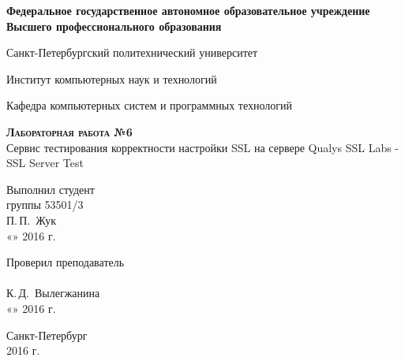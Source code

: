 \documentclass[10pt,a4paper,titlepage]{article}
\begin{document}
\begin{titlepage}
  \begin{center}
    \large
    \textbf{Федеральное государственное автономное образовательное учреждение\\
    Высшего профессионального образования}

    \vspace{0.25cm}

    Санкт-Петербургский политехнический университет
    \vspace{0.25cm}
    
    Институт компьютерных наук и технологий
    \vspace{0.25cm}
    
    Кафедра компьютерных систем и программных технологий
    \vfill

    \textbf{\textsc{Лабораторная работа №6}}\\[5mm]
    
    {\LARGE Сервис тестирования корректности настройки SSL на сервере Qualys SSL Labs - SSL Server Test}
  \bigskip
    
\end{center}
\vfill

\newlength{\ML}
\hfill\begin{minipage}{0.4\textwidth}
  Выполнил студент\\ группы 53501/3\\
  \underline{\hspace{\ML}} П.\,П.~Жук\\
  «\underline{\hspace{0.7cm}}» \underline{\hspace{2cm}} 2016 г.
\end{minipage}%
\bigskip

\hfill\begin{minipage}{0.4\textwidth}
  Проверил преподаватель\\
  \underline{\hspace{\ML}}\\ К.\,Д.~Вылегжанина\\
  «\underline{\hspace{0.7cm}}» \underline{\hspace{2cm}} 2016 г.
\end{minipage}%
\vfill

\begin{center}
  Санкт-Петербург\\ 2016 г.
\end{center}
\end{titlepage}
\end{document}

